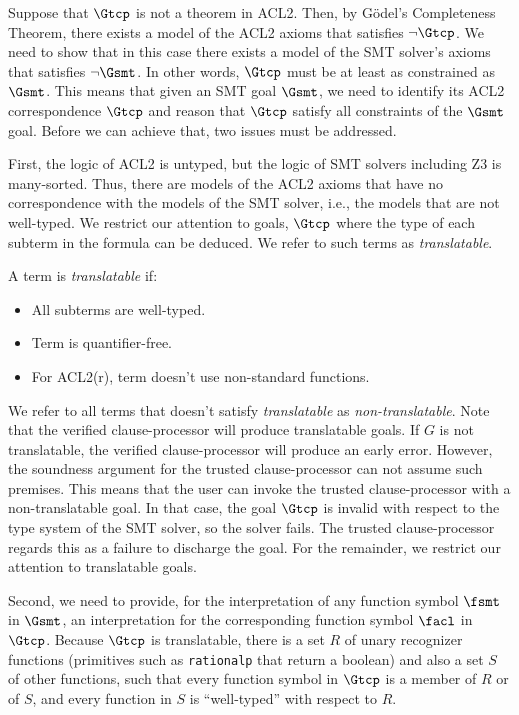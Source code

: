 Suppose that $\Gtcp$ is not a theorem in ACL2.  Then, by G\"{o}del's
Completeness Theorem, there exists a model of the ACL2 axioms that satisfies
$\neg \Gtcp$. We need to show that in this case there exists a model of the
\acs{SMT} solver's axioms that satisfies $\neg \Gsmt$.
In other words, $\Gtcp$ must be at least as constrained as $\Gsmt$. This means
that given an \acs{SMT} goal $\Gsmt$, we need to identify its ACL2
correspondence $\Gtcp$ and reason that $\Gtcp$ satisfy all constraints of the
$\Gsmt$ goal.
Before we can achieve that, two issues must be addressed.

First, the logic of ACL2 is untyped, but the logic of \acs{SMT} solvers
including Z3 is many-sorted. Thus, there are models of the ACL2
axioms that have no correspondence with the models of the \acs{SMT} solver,
i.e., the models that are not well-typed. We restrict our attention to goals,
$\Gtcp$ where the type of each subterm in the formula can be deduced.
We refer to such terms as \emph{translatable}.

\begin{definition}[Translatable]
  A term is \emph{translatable} if:
  \begin{itemize}
  \item All subterms are well-typed.
  \item Term is quantifier-free.
  \item For ACL2(r), term doesn't use non-standard functions.
  \end{itemize}
\end{definition}

We refer to all terms that doesn't satisfy \emph{translatable} as
\emph{non-translatable}.
Note that the verified clause-processor will produce translatable goals. If $G$
is not translatable, the verified clause-processor will produce an early error.
However, the soundness argument for the trusted clause-processor can not assume
such premises. This means that the user can invoke the trusted clause-processor
with a non-translatable goal. In that case, the goal $\Gtcp$ is invalid with
respect to the type system of the \acs{SMT} solver, so the solver fails. The
trusted clause-processor regards this as a failure to discharge the goal.
For the remainder, we restrict our attention to translatable goals.

Second, we need to provide, for the interpretation of any function symbol
$\fsmt$ in $\Gsmt$, an interpretation for the corresponding function symbol
$\facl$ in $\Gtcp$.
Because $\Gtcp$ is translatable, there is a set $R$ of unary recognizer functions
(primitives such as \texttt{rationalp} that return a boolean) and also a set $S$
of other functions, such that every function symbol in $\Gtcp$ is a member of $R$
or of $S$, and every function in $S$ is ``well-typed'' with respect to $R$.

